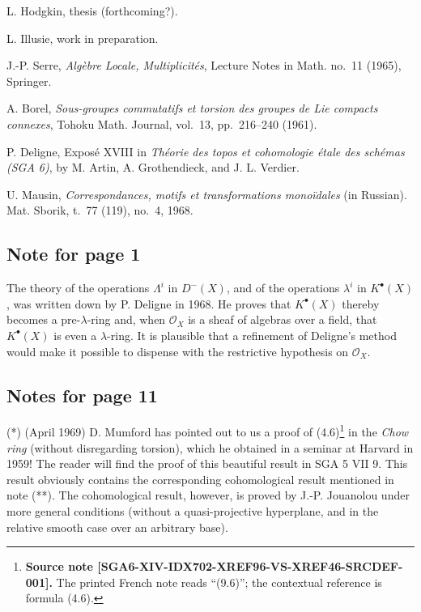\begin{enumerate}[label={[\arabic*]},leftmargin=3.2em]
\item L. Hodgkin, thesis (forthcoming?).

\item L. Illusie, work in preparation.

\item J.-P. Serre, \emph{Alg\`ebre Locale, Multiplicit\'es},
  Lecture Notes in Math. no.~11 (1965), Springer.

\item A. Borel,
  \emph{Sous-groupes commutatifs et torsion des groupes de Lie compacts
  connexes}, Tohoku Math. Journal, vol.~13, pp.~216--240 (1961).

\item[{[16]}(*)] P. Deligne, Expos\'e XVIII in
  \emph{Th\'eorie des topos et cohomologie \'etale des sch\'emas (SGA 6)},
  by M. Artin, A. Grothendieck, and J. L. Verdier.

\item[{[17]}(*)] U. Mausin,
  \emph{Correspondances, motifs et transformations mono\"idales}
  (in Russian). Mat. Sborik, t.~77 (119), no.~4, 1968.
\end{enumerate}


\subsection*{Note for page 1}

The theory of the operations $\Lambda^i$ in $D^{-}(X)$, and of the
operations $\lambda^i$ in $K^\bullet(X)$, was written down by P. Deligne in
1968. He proves that $K^\bullet(X)$ thereby becomes a pre-$\lambda$-ring and,
when $\mathcal O_X$ is a sheaf of algebras over a field, that
$K^\bullet(X)$ is even a $\lambda$-ring. It is plausible that a refinement
of Deligne's method would make it possible to dispense with the restrictive
hypothesis on $\mathcal O_X$.

\subsection*{Notes for page 11}

\noindent(*) (April 1969) D. Mumford has pointed out to us a proof of
(4.6)\footnote{\textbf{Source note
[SGA6-XIV-IDX702-XREF96-VS-XREF46-SRCDEF-001].} The printed French note
reads ``(9.6)''; the contextual reference is formula (4.6).}
in the \emph{Chow ring} (without disregarding torsion), which he obtained in
a seminar at Harvard in 1959! The reader will find the proof of this
beautiful result in SGA 5 VII 9. This result obviously contains the
corresponding cohomological result mentioned in note (**). The cohomological
result, however, is proved by J.-P. Jouanolou under more general conditions
(without a quasi-projective hyperplane, and in the relative smooth case over
an arbitrary base).

